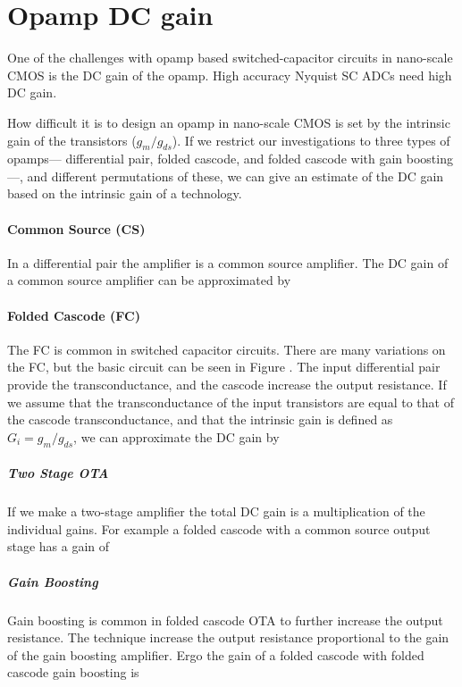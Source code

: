 
\chapter{Opamp DC gain}
One of the challenges with opamp based switched-capacitor circuits in
nano-scale CMOS is the DC gain of the opamp. High accuracy Nyquist SC ADCs
need high DC gain.

How difficult it is to design an opamp in nano-scale CMOS is set by
the intrinsic gain of the transistors ($g_m/g_{ds}$). If we restrict
our investigations to
three types of opamps--- differential pair, folded cascode, and folded
cascode with gain boosting ---, and different permutations of these,
we can give an estimate of the DC gain based on the
intrinsic gain  of a technology. 

\subsubsection{Common Source (CS)}
In a differential pair the amplifier is a common source amplifier.
The DC gain of a common source amplifier can be approximated by


\subsubsection{Folded Cascode (FC)}
The FC is common in switched
capacitor circuits. There are many variations on the FC, but the basic circuit
can be seen in Figure \label{fig:foldedcasc}. The input differential
pair provide the transconductance, and the cascode  increase the
output resistance. If we assume that the transconductance of the input
transistors are equal to that of the cascode transconductance, and that
the intrinsic gain is defined as $G_i = g_m/g_{ds}$, we can
approximate the DC gain by


\paragraph{Two Stage OTA}
If we make a two-stage amplifier the total DC gain is a multiplication of
the individual gains. For example a folded cascode with a common
source output stage has a gain of

\paragraph{Gain Boosting}
Gain boosting is common in folded cascode OTA to further increase the
output resistance. The technique increase the output
resistance proportional to the gain of the gain boosting
amplifier. Ergo the gain of a folded cascode with folded cascode gain
boosting is

